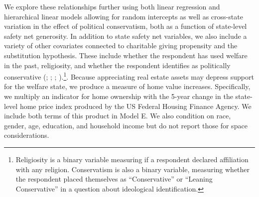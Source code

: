 \documentclass[
  11pt,
  oneside]{article}
\begin{document}
We explore these relationships further using both linear regression and hierarchical linear models allowing for random intercepts as well as cross-state variation in the effect of political conservatism, both as a function of state-level safety net generosity. In addition to state safety net variables, we also include a variety of other covariates connected to charitable giving propensity and the substitution hypothesis. These include whether the respondent has used welfare in the past, religiosity, and whether the respondent identifies as politically conservative (; ; ; ).\footnote{Religiosity is a binary variable measuring if a respondent declared affiliation with any religion. Conservatism is also a binary variable, measuring whether the respondent placed themselves as ``Conservative'' or ``Leaning Conservative'' in a question about ideological identification.}. Because appreciating real estate assets may depress support for the welfare state, we produce a measure of home value increases. Specifically, we multiply an indicator for home ownership with the 5-year change in the state-level home price index produced by the US Federal Housing Finance Agency. We include both terms of this product in Model E. We also condition on race, gender, age, education, and household income but do not report those for space considerations.
\end{document}
